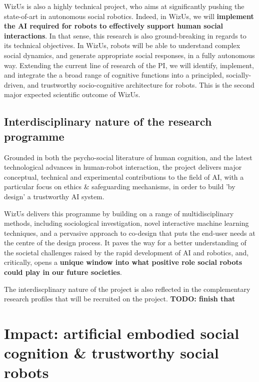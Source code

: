 \documentclass[11pt,a4paper]{report}
\newcommand{\project}{WizUs\xspace}
\newcommand{\TODO}[1]{{\color{red}\textbf{TODO: #1}}}
\begin{document}
\project is also a highly technical project, who aims at significantly
pushing the state-of-art in autonomous social robotics. Indeed, in \project, we will
\textbf{implement the AI required for robots to effectively support
human social interactions}.  In that sense, this research is also
ground-breaking in regards to its technical objectives. In \project, robots will
be able to understand complex social dynamics, and generate appropriate social
responses, in a fully autonomous way.  Extending the current line of research of
the PI, we will identify, implement, and integrate the a broad range of cognitive functions into a
principled, socially-driven, and trustworthy socio-cognitive architecture for
robots. This is the second major expected scientific outcome of \project.


\subsection{Interdisciplinary nature of the research programme}


Grounded in both the psycho-social literature of human cognition, and the latest
technological advances in human-robot interaction, the project delivers
major conceptual, technical and experimental contributions to the field of AI, 
with a particular focus on ethics \& safeguarding mechanisms, in order to build 'by 
design' a trustworthy AI system.

\project delivers this programme by building on a range of multidisciplinary
methods, including sociological investigation, novel interactive machine
learning techniques, and a pervasive approach to co-design that puts the
end-user needs at the centre of the design process. It paves the way for a
better understanding of the societal challenges raised by the rapid development
of AI and robotics, and, critically, opens a \textbf{unique window into what
positive role social robots could play in our future societies}.

The interdiscplinary nature of the project is also reflected in the
complementary research profiles that will be recruited on the project.
\TODO{finish that}


\section{Impact: artificial embodied social cognition \& trustworthy social robots}
\end{document}
